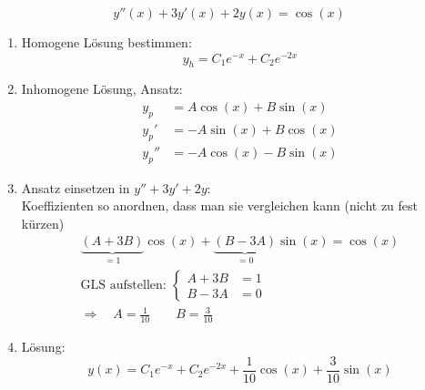 \documentclass[a4paper]{article}
\begin{document}
		\newpage
		\begin{multicols}{2}
			
		\begin{fmerke}[Beispiel]
			\vspace{1mm}
				$$y''(x) + 3 y'(x) + 2y(x) = \cos(x)$$
			\begin{enumerate}
				\item Homogene Lösung bestimmen: \\
				\vspace{-3mm}
					$$y_h = C_1 e^{-x} + C_2 e^{-2x}$$
				\vspace{-8mm}
				\item Inhomogene Lösung, Ansatz: \\
				\vspace{-6mm}
					\begin{align*}
						y_p &= A \cos(x) + B \sin(x)\\
						y_p ' &= -A \sin(x) + B \cos(x)\\
						y_p '' &= -A \cos(x) - B \sin(x)
					\end{align*}
					\vspace{-8mm}
				\item Ansatz einsetzen in $y'' + 3y' + 2y$: \\
					Koeffizienten so anordnen, dass man sie vergleichen kann (nicht zu fest kürzen)
						\begin{align*}
							\underbrace{(A + 3B)}_{=1} \cos(x) + \underbrace{(B - 3A)}_{=0} \sin(x) = \cos(x)\\
							\text{GLS aufstellen: }\begin{cases}
							                        A+3B &=1\\
							                        B-3A &=0
							                       \end{cases}\qquad \\ 
						\Longrightarrow \quad A = \frac{1}{10} \qquad B =\frac{3}{10} \qquad \qquad
						\end{align*}
				\vspace{-8mm}
				\item Lösung: \\
				\vspace{-3mm}
					$$y(x) = C_1 e^{-x} + C_2 e^{-2x} + \frac{1}{10} \cos(x) + \frac{3}{10} \sin(x)$$
					\vspace{-6mm}
			\end{enumerate}
			\end{fmerke}


\end{multicols}
\end{document}
